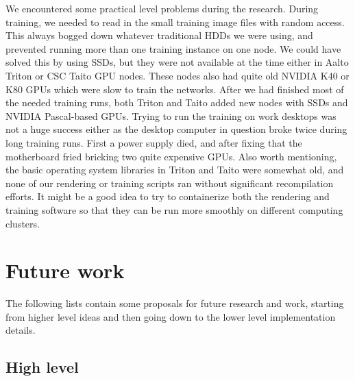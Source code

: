 We encountered some practical level problems during the research. During training, we needed to read in the small training image files with random access. This always bogged down whatever traditional \acp{HDD} we were using, and prevented running more than one training instance on one node. We could have solved this by using \acp{SSD}, but they were not available at the time either in Aalto Triton or \ac{CSC} Taito \ac{GPU} nodes. These nodes also had quite old NVIDIA K40 or K80 \acp{GPU} which were slow to train the networks. After we had finished most of the needed training runs, both Triton and Taito added new nodes with \acp{SSD} and NVIDIA Pascal-based \acp{GPU}. Trying to run the training on work desktops was not a huge success either as the desktop computer in question broke twice during long training runs. First a power supply died, and after fixing that the motherboard fried bricking two quite expensive \acp{GPU}. Also worth mentioning, the basic operating system libraries in Triton and Taito were somewhat old, and none of our rendering or training scripts ran without significant recompilation efforts. It might be a good idea to try to containerize both the rendering and training software so that they can be run more smoothly on different computing clusters.

\section{Future work}

The following lists contain some proposals for future research and work, starting from higher level ideas and then going down to the lower level implementation details.

\subsection{High level}

